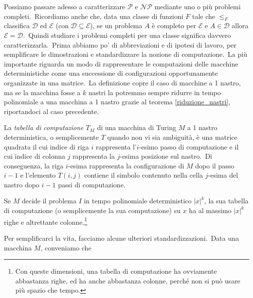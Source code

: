 \noindent Possiamo passare adesso a caratterizzare $\mathcal{P}$ e $\mathcal{NP}$ mediante uno o più problemi completi.\
Ricordiamo anche che, data una classe di funzioni $F$ tale che $\leqslant_F$ classifica $\mathcal{D}$ ed $\mathcal{E}$ (con $\mathcal{D} \subseteq\mathcal{E}$), se un problema $A$ è completo per $\mathcal{E}$ e $A \in \mathcal{D}$ allora $\mathcal{E} = \mathcal{D}$.\
Quindi studiare i problemi completi per una classe significa davvero caratterizzarla.\
Prima abbiamo po' di abbreviazioni e di ipotesi di lavoro, per semplificare le dimostrazioni e standardizzare la nozione di computazione.\
La più importante riguarda un modo di rappresentare le computazioni delle macchine deterministiche come una successione di configurazioni opportunamente organizzate in una matrice.\
La definizione copre il caso di macchine a 1 nastro, ma se la macchina fosse a $k$ nastri la potremmo sempre ridurre in tempo polinomiale a una macchina a 1 nastro grazie al teorema \ref{riduzione_nastri}, riportandoci al caso precedente.

\begin{definition} [Tabella di Computazione]

    La \textit{tabella di computazione} $T_M$ di una macchina di Turing $M$ a 1 nastro deterministica, o semplicemente $T$ quando non vi sia ambiguità, è una matrice quadrata il cui indice di riga $i$ rappresenta l'$i$-esimo passo di computazione e il cui indice di colonna $j$ rappresenta la $j$-esima posizione sul nastro.\
    Di conseguenza, la riga $i$-esima rappresenta la configurazione di $M$ dopo il passo $i-1$ e l'elemento $T(i,j)$ contiene il simbolo contenuto nella cella $j$-esima del nastro dopo $i-1$ passi di computazione.\

\end{definition}

\noindent Se $M$ decide il problema $I$ in tempo polinomiale deterministico $|x|^k$, la sua tabella di computazione (o semplicemente la sua computazione) su $x$ ha al massimo $|x|^k$ righe e altrettante colonne.\footnote{Con queste dimensioni, una tabella di computazione ha ovviamente abbastanza righe, ed ha anche abbastanza colonne, perché non si può usare più spazio che tempo.}

\medskip
\noindent Per semplificarci la vita, facciamo alcune ulteriori standardizzazioni.\
Data una macchina $M$, conveniamo che

